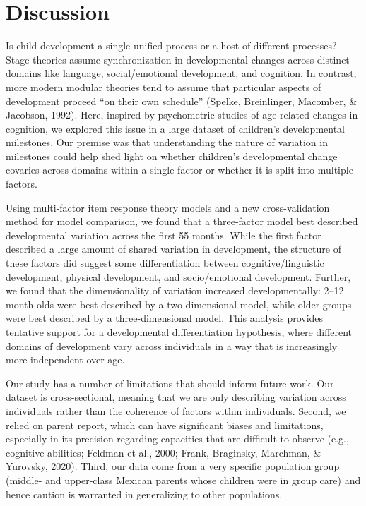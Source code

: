 \documentclass[10pt, letterpaper]{article}
\begin{document}
\hypertarget{discussion}{%
\section{Discussion}\label{discussion}}

Is child development a single unified process or a host of different
processes? Stage theories assume synchronization in developmental
changes across distinct domains like language, social/emotional
development, and cognition. In contrast, more modern modular theories
tend to assume that particular aspects of development proceed ``on their
own schedule'' (Spelke, Breinlinger, Macomber, \& Jacobson, 1992). Here,
inspired by psychometric studies of age-related changes in cognition, we
explored this issue in a large dataset of children's developmental
milestones. Our premise was that understanding the nature of variation
in milestones could help shed light on whether children's developmental
change covaries across domains within a single factor or whether it is
split into multiple factors.

Using multi-factor item response theory models and a new
cross-validation method for model comparison, we found that a
three-factor model best described developmental variation across the
first 55 months. While the first factor described a large amount of
shared variation in development, the structure of these factors did
suggest some differentiation between cognitive/linguistic development,
physical development, and socio/emotional development. Further, we found
that the dimensionality of variation increased developmentally: 2--12
month-olds were best described by a two-dimensional model, while older
groups were best described by a three-dimensional model. This analysis
provides tentative support for a developmental differentiation
hypothesis, where different domains of development vary across
individuals in a way that is increasingly more independent over age.

Our study has a number of limitations that should inform future work.
Our dataset is cross-sectional, meaning that we are only describing
variation across individuals rather than the coherence of factors within
individuals. Second, we relied on parent report, which can have
significant biases and limitations, especially in its precision
regarding capacities that are difficult to observe (e.g., cognitive
abilities; Feldman et al., 2000; Frank, Braginsky, Marchman, \&
Yurovsky, 2020). Third, our data come from a very specific population
group (middle- and upper-class Mexican parents whose children were in
group care) and hence caution is warranted in generalizing to other
populations.
\end{document}
